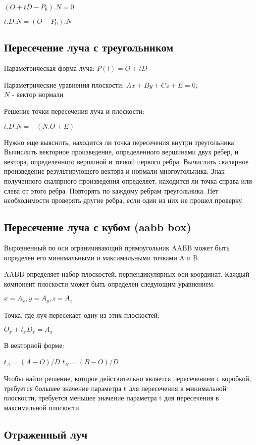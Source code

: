 $(O + tD - P_0).N = 0$

$t.D.N = (O-P_0).N$


\subsection*{Пересечение луча с треугольником}

Параметрическая форма луча: $P(t) = O + tD$

Параметрические уравнения плоскости: $Ax + By + Cz + E = 0$;\\
$N$ - вектор нормали

Решение точки пересечения луча и плоскости:

$t.D.N = -(N.O + E)$

Нужно еще выяснить, находится ли точка пересечения внутри треугольника.
Вычислить векторное произведение, определенного вершинами двух
ребер, и вектора, определенного вершиной и точкой первого ребра.
Вычислить скалярное произведение результирующего вектора и нормали многоугольника.
Знак полученного скалярного произведения определяет, находится ли точка
справа или слева от этого ребра. Повторять по каждому ребрам треугольника.
Нет необходимости проверять другие ребра, если один из них не прошел проверку.


\subsection*{Пересечение луча с кубом (aabb box)}

Выровненный по оси ограничивающий прямоугольник AABB может быть определен его минимальными и максимальными точками A и B.

AABB определяет набор плоскостей, перпендикулярных оси координат. Каждый компонент плоскости может быть определен следующим уравнением:

$
x = A_x, y = A_y, z = A_z
$

Точка, где луч пересекает одну из этих плоскостей:

$
O_x + t_x D_x = A_x
$

В векторной форме:

$t_A = (A - O) / D$ \quad $t_B = (B - O) / D$

Чтобы найти решение, которое действительно является пересечением с коробкой, требуется большее значение параметра t для пересечения в минимальной плоскости, требуется меньшее значение параметра t для пересечения в максимальной плоскости.


\subsection*{Отраженный луч}

